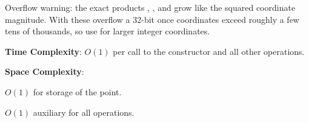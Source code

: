 Overflow warning: the exact products , , and  grow like the squared coordinate magnitude. With  these overflow a 32-bit  once coordinates exceed roughly a few tens of thousands, so use  for larger integer coordinates.

\textbf{Time Complexity}: $O(1)$ per call to the constructor and all other operations.

\textbf{Space Complexity}:
\begin{compactitem}
  \item $O(1)$ for storage of the point.
  \item $O(1)$ auxiliary for all operations.
\end{compactitem}

